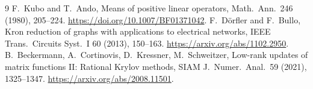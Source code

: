 \documentclass[11pt]{article}
\begin{document}
\begin{thebibliography}{9}
 F.~Kubo and T.~Ando, Means of positive linear operators,
Math.~Ann.~246 (1980), 205--224.
\url{https://doi.org/10.1007/BF01371042}.
 F.~D\"orfler and F.~Bullo, Kron reduction of graphs with
applications to electrical networks, IEEE Trans.~Circuits Syst.~I
60 (2013), 150--163.
\url{https://arxiv.org/abs/1102.2950}.
 B.~Beckermann, A.~Cortinovis, D.~Kressner,
M.~Schweitzer, Low-rank updates of matrix functions II: Rational Krylov
methods, SIAM J.~Numer.~Anal.~59 (2021), 1325--1347.
\url{https://arxiv.org/abs/2008.11501}.
\end{thebibliography}
\end{document}
